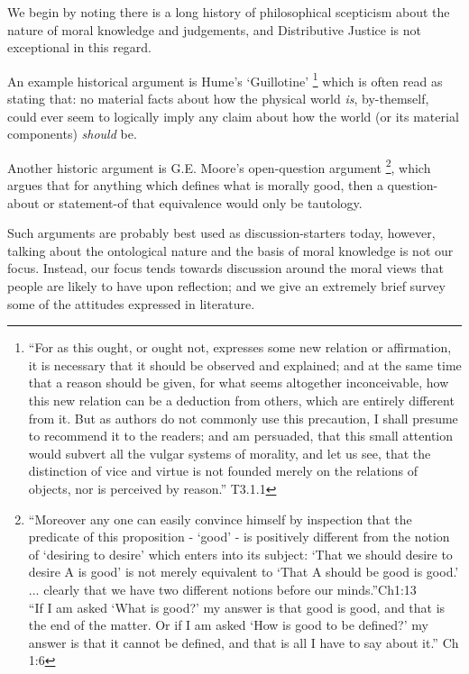 We begin by noting there is a long history of philosophical scepticism about the nature of moral knowledge and judgements, and Distributive Justice is not exceptional in this regard.

An example historical argument is Hume's `Guillotine' \citep{HumeGutenberg}\footnote{``For as this ought, or ought not, expresses some new relation or affirmation, it is necessary that it should be observed and explained; and at the same time that a reason should be given, for what seems altogether inconceivable, how this new relation can be a deduction from others, which are entirely different from it. But as authors do not commonly use this precaution, I shall presume to recommend it to the readers; and am persuaded, that this small attention would subvert all the vulgar systems of morality, and let us see, that the distinction of vice and virtue is not founded merely on the relations of objects, nor is perceived by reason.'' T3.1.1} which is often read as stating that: no material facts about how the physical world \textit{is}, by-themself, could ever seem to logically imply any claim about how the world (or its material components) \textit{should} be.

Another historic argument is G.E. Moore's open-question argument \citep{MooreGutenberg}\footnote{
``Moreover any one can easily convince himself by inspection that the predicate of this proposition - `good' - is positively different from the notion of `desiring to desire' which enters into its subject: `That we should desire to desire A is good' is not merely equivalent to `That A should be good is good.' ... clearly that we have two different notions before our minds.''Ch1:13\\
``If I am asked `What is good?' my answer is that good is good, and that is the end of the matter. Or if I am asked `How is good to be defined?' my answer is that it cannot be defined, and that is all I have to say about it.'' Ch 1:6}, which argues that for anything which defines what is morally good, then a question-about or statement-of that equivalence would only be tautology.

Such arguments are probably best used as discussion-starters today, however, talking about the ontological nature and the basis of moral knowledge is not our focus.
Instead, our focus tends towards discussion around the moral views that people are likely to have upon reflection; and we give an extremely brief survey some of the attitudes expressed in literature.

